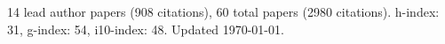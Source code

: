 14 lead author papers (908 citations),
60 total papers (2980 citations).\newline
h-index: 31, g-index: 54, i10-index: 48. Updated \today.